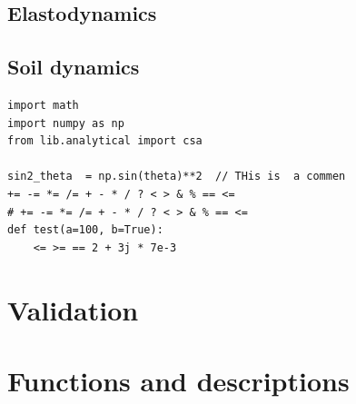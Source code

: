 \documentclass{report}
\begin{document}
\pagebreak

\section{Elastodynamics}
\pagebreak

\section{Soil dynamics}



\pagebreak




\begin{lstlisting}[language=PSD]
import math
import numpy as np
from lib.analytical import csa

sin2_theta  = np.sin(theta)**2  // THis is  a commen
+= -= *= /= + - * / ? < > & % == <=
# += -= *= /= + - * / ? < > & % == <=
def test(a=100, b=True):
    <= >= == 2 + 3j * 7e-3
\end{lstlisting}

\chapter{Validation}


\chapter{Functions and descriptions}
\end{document}
